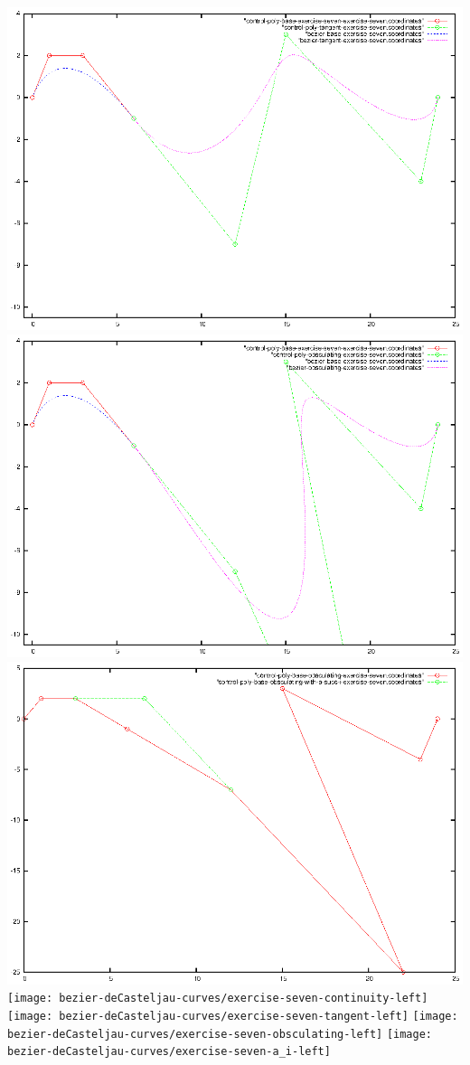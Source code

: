 \documentclass{article}
\begin{document}
\includegraphics{bezier-deCasteljau-curves/exercise-seven-tangent}
\includegraphics{bezier-deCasteljau-curves/exercise-seven-obsculating}
\includegraphics{bezier-deCasteljau-curves/exercise-seven-a_succ_i}
\texttt{[image: bezier-deCasteljau-curves/exercise-seven-continuity-left]}
\texttt{[image: bezier-deCasteljau-curves/exercise-seven-tangent-left]}
\texttt{[image: bezier-deCasteljau-curves/exercise-seven-obsculating-left]}
\texttt{[image: bezier-deCasteljau-curves/exercise-seven-a\_i-left]}
\end{document}
